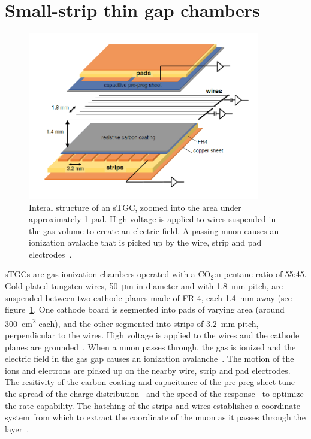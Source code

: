 \section{Small-strip thin gap chambers}

\begin{figure}
    \centering
    \includegraphics[width = 0.9\textwidth]{figures/stgc_internals.png}
    \caption{Interal structure of an sTGC, zoomed into the area under approximately 1 pad. High voltage is applied to wires suspended in the gas volume to create an electric field. A passing muon causes an ionization avalache that is picked up by the wire, strip and pad electrodes~\cite{lefebvre_precision_2020}.}
    \label{fig:stgc_internals}
\end{figure}

sTGCs are gas ionization chambers operated with a CO$_2$:n-pentane ratio of 55:45. Gold-plated tungsten wires, \SI{50}{\micro\meter} in diameter and with \SI{1.8}{mm} pitch, are suspended between two cathode planes made of FR-4, each \SI{1.4}{mm} away (see figure~\ref{fig:stgc_internals}. One cathode board is segmented into pads of varying area (around \SI{300}{cm^2} each), and the other segmented into strips of \SI{3.2}{mm} pitch, perpendicular to the wires. High voltage is applied to the wires and the cathode planes are grounded~\cite{nsw_tdr, perez-codina_small-strip_2016}. When a muon passes through, the gas is ionized and the electric field in the gas gap causes an ionization avalanche~\cite{townsend_electricity_1915}. The motion of the ions and electrons are picked up on the nearby wire, strip and pad electrodes. The resitivity of the carbon coating and capacitance of the pre-preg sheet tune the spread of the charge distribution~\cite{gatti_optimum_1979} and the speed of the response~\cite{battistoni_resistive_1982} to optimize the rate capability. The hatching of the strips and wires establishes a coordinate system from which to extract the coordinate of the muon as it passes through the layer~\cite{nsw_tdr}. 


